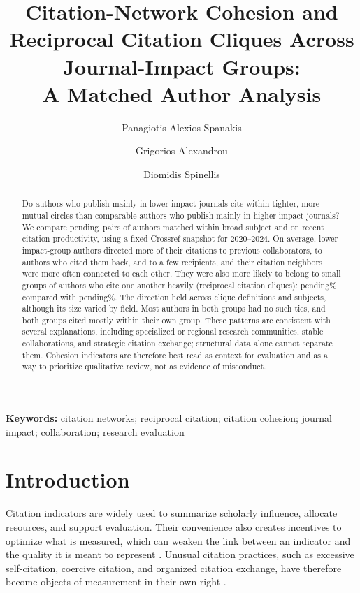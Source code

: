 \documentclass[12pt]{article}
\title{Citation-Network Cohesion and Reciprocal Citation Cliques Across Journal-Impact Groups:\\
A Matched Author Analysis}
\author{Panagiotis-Alexios Spanakis}
\author{Grigorios Alexandrou}
\author{Diomidis Spinellis}
\affil{Department of Management Science and Technology,
Athens University of Economics and Business (AUEB), Athens, Greece}
\date{}
\providecommand{\MatchedPairCount}{pending}
\providecommand{\CliqueCaseMembershipPercent}{pending}
\providecommand{\CliqueControlMembershipPercent}{pending}
\begin{document}
\maketitle
\linenumbers

\begin{abstract}
Do authors who publish mainly in lower-impact journals cite within tighter, more mutual circles than comparable authors who publish mainly in higher-impact journals?  We compare \MatchedPairCount\ pairs of authors matched within broad subject and on recent citation productivity, using a fixed Crossref snapshot for 2020--2024.  On average, lower-impact-group authors directed more of their citations to previous collaborators, to authors who cited them back, and to a few recipients, and their citation neighbors were more often connected to each other.  They were also more likely to belong to small groups of authors who cite one another heavily (reciprocal citation cliques): \CliqueCaseMembershipPercent\% compared with \CliqueControlMembershipPercent\%.  The direction held across clique definitions and subjects, although its size varied by field.  Most authors in both groups had no such ties, and both groups cited mostly within their own group.  These patterns are consistent with several explanations, including specialized or regional research communities, stable collaborations, and strategic citation exchange; structural data alone cannot separate them.  Cohesion indicators are therefore best read as context for evaluation and as a way to prioritize qualitative review, not as evidence of misconduct.
\end{abstract}

\noindent\textbf{Keywords:} citation networks; reciprocal citation; citation cohesion; journal impact; collaboration; research evaluation

\section{Introduction}
\label{sec:introduction}

Citation indicators are widely used to summarize scholarly influence, allocate resources, and support evaluation.  Their convenience also creates incentives to optimize what is measured, which can weaken the link between an indicator and the quality it is meant to represent \parencite{Goo84,Hicks2015,Biagioli2019}.  Unusual citation practices, such as excessive self-citation, coercive citation, and organized citation exchange, have therefore become objects of measurement in their own right \parencite{Wilhite2012,VanNoorden2019,Biagioli2020}.
\end{document}
